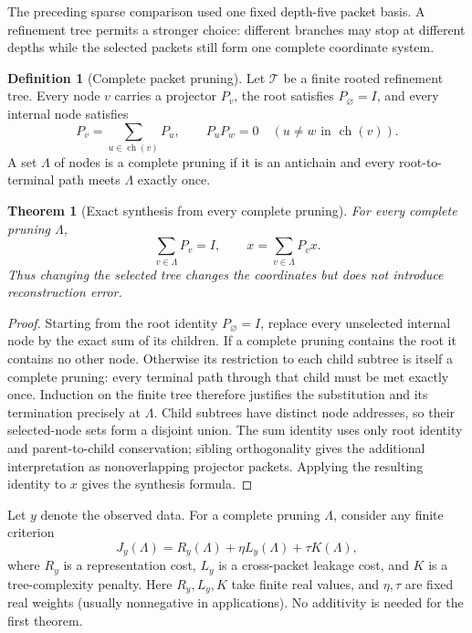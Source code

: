 \documentclass[11pt,letterpaper]{article}
\newtheorem{theorem}{Theorem}[section]
\theoremstyle{plain}
\theoremstyle{plain}
\theoremstyle{plain}
\theoremstyle{definition}
\newtheorem{definition}[definition]{Definition}
\theoremstyle{definition}
\theoremstyle{definition}
\theoremstyle{definition}
\theoremstyle{remark}
\theoremstyle{remark}
\theoremstyle{remark}
\theoremstyle{remark}
\begin{document}
The preceding sparse comparison used one fixed depth-five packet basis.  A refinement tree permits a stronger choice: different branches may stop at different depths while the selected packets still form one complete coordinate system.

\begin{definition}[Complete packet pruning]\label{core:record:22}
Let $\mathcal T$ be a finite rooted refinement tree.  Every node $v$ carries a projector $P_v$, the root satisfies $P_{\varnothing}=I$, and every internal node satisfies
\[
P_v=\sum_{u\in\operatorname{ch}(v)}P_u,
\qquad
P_uP_w=0\quad(u\ne w\text{ in }\operatorname{ch}(v)).
\]
A set $\Lambda$ of nodes is a complete pruning if it is an antichain and every root-to-terminal path meets $\Lambda$ exactly once.
\end{definition}

\begin{theorem}[Exact synthesis from every complete pruning]\label{result:13}
For every complete pruning $\Lambda$,
\[
\boxed{\sum_{v\in\Lambda}P_v=I,}
\qquad
\boxed{x=\sum_{v\in\Lambda}P_vx.}
\]
Thus changing the selected tree changes the coordinates but does not introduce reconstruction error.
\end{theorem}

\begin{proof}
Starting from the root identity $P_{\varnothing}=I$, replace every unselected internal node by the exact sum of its children.  If a complete pruning contains the root it contains no other node. Otherwise its restriction to each child subtree is itself a complete pruning: every terminal path through that child must be met exactly once. Induction on the finite tree therefore justifies the substitution and its termination precisely at $\Lambda$. Child subtrees have distinct node addresses, so their selected-node sets form a disjoint union. The sum identity uses only root identity and parent-to-child conservation; sibling orthogonality gives the additional interpretation as nonoverlapping projector packets.  Applying the resulting identity to $x$ gives the synthesis formula.
\end{proof}

Let $y$ denote the observed data.  For a complete pruning $\Lambda$, consider any finite criterion
\[
J_y(\Lambda)
=
R_y(\Lambda)
+\eta L_y(\Lambda)
+\tau K(\Lambda),
\]
where $R_y$ is a representation cost, $L_y$ is a cross-packet leakage cost, and $K$ is a tree-complexity penalty.  Here $R_y,L_y,K$ take finite real values, and $\eta,\tau$ are fixed real weights (usually nonnegative in applications). No additivity is needed for the first theorem.
\end{document}
